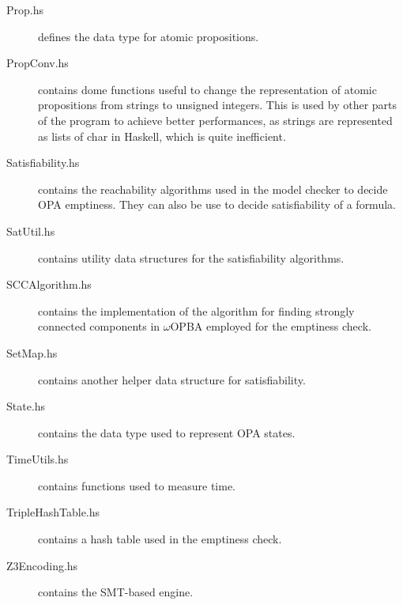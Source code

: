 \documentclass[9pt,a4paper]{article}
\begin{document}
\begin{description}
\item[Prop.hs] defines the data type for atomic propositions.
\item[PropConv.hs] contains dome functions useful to change the representation
  of atomic propositions from strings to unsigned integers.
  This is used by other parts of the program to achieve better performances,
  as strings are represented as lists of char in Haskell, which is quite
  inefficient.
\item[Satisfiability.hs] contains the reachability algorithms used in the
  model checker to decide OPA emptiness. They can also be use to decide
  satisfiability of a formula.
\item[SatUtil.hs] contains utility data structures for the satisfiability algorithms.
\item[SCCAlgorithm.hs] contains the implementation of the algorithm for finding strongly
  connected components in $\omega$OPBA employed for the emptiness check.
\item[SetMap.hs] contains another helper data structure for satisfiability.
\item[State.hs] contains the data type used to represent OPA states.
\item[TimeUtils.hs] contains functions used to measure time.
\item[TripleHashTable.hs] contains a hash table used in the emptiness check.
\item[Z3Encoding.hs] contains the SMT-based engine.
\end{description}
\end{document}
